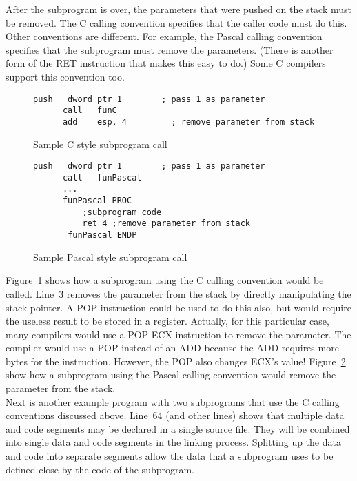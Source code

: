 After the subprogram is over, the parameters that were pushed on the
stack must be removed. The C calling convention  specifies that the caller code must do this. Other
conventions are different. For example, the Pascal calling convention
 specifies that the subprogram must
remove the parameters.  (There is another form of the RET 
instruction that makes this easy to do.) Some C compilers support this
convention too. 

\begin{figure}[t]
 \begin{lstlisting}[language={[x86masm]Assembler}]
      push   dword ptr 1        ; pass 1 as parameter
      call   funC
      add    esp, 4         ; remove parameter from stack
\end{lstlisting}
\caption{Sample C style subprogram call \label{fig:subcallC}}
\end{figure}

\begin{figure}[t]
 \begin{lstlisting}[language={[x86masm]Assembler}]
      push   dword ptr 1        ; pass 1 as parameter
      call   funPascal
      ...
      funPascal PROC
          ;subprogram code
          ret 4 ;remove parameter from stack
       funPascal ENDP
\end{lstlisting}
\caption{Sample Pascal style subprogram call \label{fig:subcallP}}
\end{figure}

Figure~\ref{fig:subcallC} shows how a subprogram using the C calling
convention would be called. Line~3 removes the parameter from the
stack by directly manipulating the stack pointer. A {\code POP}
instruction could be used to do this also, but would require the
useless result to be stored in a register. Actually, for this
particular case, many compilers would use a {\code POP ECX}
instruction to remove the parameter. The compiler would use a {\code
POP} instead of an {\code ADD} because the {\code ADD} requires more
bytes for the instruction. However, the {\code POP} also changes ECX's
value!  Figure~\ref{fig:subcallP} show how a subprogram using the Pascal
calling convention would remove the parameter from the stack. \\

Next is another example program with two subprograms that use
the C calling conventions discussed above. Line~64 (and other lines)
shows that multiple data and code segments may be declared in a single
source file. They will be combined into single data and code segments
in the linking process. Splitting up the data and code into separate
segments allow the data that a subprogram uses to be defined close by
the code of the subprogram.

